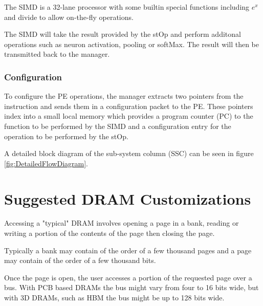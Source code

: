 \documentclass[journal]{IEEEtran}
\begin{document}
The SIMD is a 32-lane processor with some builtin special functions including $e^x$ and divide to allow on-the-fly operations. 

The SIMD will take the result provided by the stOp and perform additonal operations such as neuron activation, pooling or softMax. The result will then be transmitted back to the manager.

\subsubsection{Configuration}
\label{ssec:peConfiguration}

To configure the PE operations, the manager extracts two pointers from the instruction and sends them in a configuration packet to the PE. These pointers index into a small local memory which provides a program counter (PC) to the function to be performed by the SIMD and a configuration entry for the operation to be performed by the stOp.
 

\bigskip
A detailed block diagram of the sub-system column (SSC) can be seen in figure \ref{fig:DetailedFlowDiagram}.

\section{Suggested DRAM Customizations}
\label{sec:Suggested DRAM Customizations}

Accessing a "typical" DRAM involves opening a page in a bank, reading or writing a portion of the contents of the page then closing the page.

Typically a bank may contain of the order of a few thousand pages and a page may contain of the order of a few thousand bits.

Once the page is open, the user accesses a portion of the requested page over a bus. With PCB based DRAMs the bus might vary from four to 16 bits wide, but with 3D DRAMs, such as HBM the bus might be up to 128 bits wide.
\end{document}
